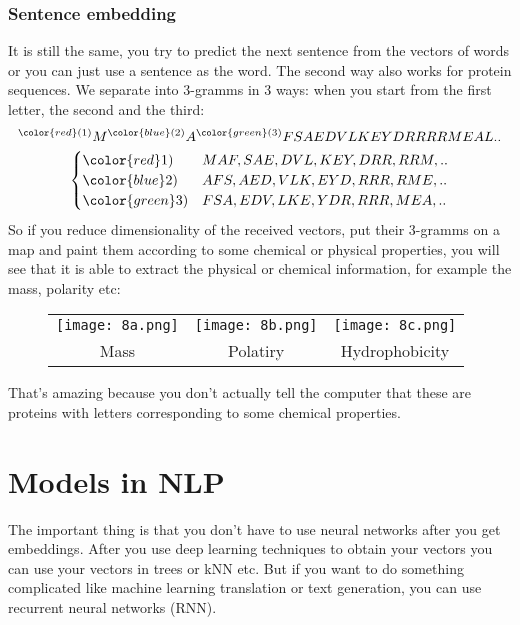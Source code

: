 \subsubsection*{Sentence embedding}

It is still the same, you try to predict the next sentence from the vectors of words or you can just use a sentence as the word.
The second way also works for protein sequences. We separate into 3-gramms in 3 ways: when you start from the first letter, the second and the third:
$$^{\color{red}(1)}M^{\color{blue}(2)}A^{\color{green}(3)}FSAEDVLKEYDRRRRMEAL..$$
$$\begin{cases}
	{\color{red} 1)} & MAF,SAE,DVL,KEY,DRR,RRM,..\\
	{\color{blue} 2)} & AFS,AED,VLK,EYD,RRR,RME,..\\
	{\color{green} 3)} & FSA,EDV,LKE,YDR,RRR,MEA,..\\
\end{cases}$$
So if you reduce dimensionality of the received vectors, put their 3-gramms on a map and paint them according to some chemical or physical properties, you will see that it is able to extract the physical or chemical information, for example the mass, polarity etc:\\
\begin{figure}[h]
  \centering
  \begin{tabular}{ccc}
    \texttt{[image: 8a.png]} & \hspace{0.5cm}
    \texttt{[image: 8b.png]} & \hspace{0.5cm}
    \texttt{[image: 8c.png]} \\
    Mass & Polatiry & Hydrophobicity \\
  \end{tabular}
\end{figure}
That's amazing because you don't actually tell the computer that these are proteins with letters corresponding to some chemical properties.

\section{Models in NLP}

The important thing is that you don't have to use neural networks after you get embeddings. After you use deep learning techniques to obtain your vectors you can use your vectors in trees or kNN etc. But if you want to do something complicated like machine learning translation or text generation, you can use recurrent neural networks (RNN).

